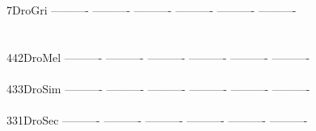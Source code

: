 \documentclass[11pt,twoside,reqno,a4paper]{article}
\begin{document}
{7\hspace*{4\charwidth}DroGri	----------	----------	----------	----------	----------	----------	\\
\hspace*{5\charwidth}\hspace*{7\charwidth}\hspace*{1\charwidth}\hspace*{1\charwidth}\hspace*{1\charwidth}\hspace*{1\charwidth}\hspace*{1\charwidth}\hspace*{1\charwidth}\\
\\
442\hspace*{2\charwidth}DroMel	----------	----------	----------	----------	----------	----------	\\
\hspace*{5\charwidth}\hspace*{7\charwidth}\hspace*{1\charwidth}\hspace*{1\charwidth}\hspace*{1\charwidth}\hspace*{1\charwidth}\hspace*{1\charwidth}\hspace*{1\charwidth}\\
433\hspace*{2\charwidth}DroSim	----------	----------	----------	----------	----------	----------	\\
\hspace*{5\charwidth}\hspace*{7\charwidth}\hspace*{1\charwidth}\hspace*{1\charwidth}\hspace*{1\charwidth}\hspace*{1\charwidth}\hspace*{1\charwidth}\hspace*{1\charwidth}\\
331\hspace*{2\charwidth}DroSec	----------	----------	----------	----------	----------	----------	\\
\hspace*{5\charwidth}\hspace*{7\charwidth}\hspace*{1\charwidth}\hspace*{1\charwidth}\hspace*{1\charwidth}\hspace*{1\charwidth}\hspace*{1\charwidth}\hspace*{1\charwidth}\\
}
\end{document}
